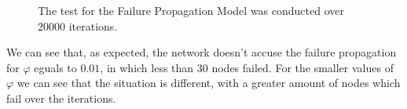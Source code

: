         \begin{figure}[H]
            \centering
            \begin{subfigure}{0.50\textwidth}
            \end{subfigure}
            \caption{The test for the Failure Propagation Model was conducted over $20000$ iterations.}
            \label{fail_prop_model}
        \end{figure}

        We can see that, as expected, the network doesn't accuse the failure propagation for $\varphi$ eguals to
        $0.01$, in which less than $30$ nodes failed. For the smaller values of $\varphi$ we can see that the
        situation is different, with a greater amount of nodes which fail over the iterations.
